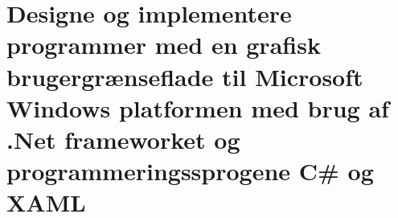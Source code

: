 \section{Designe og implementere programmer med en grafisk brugergrænseflade til Microsoft Windows platformen med brug af .Net frameworket og programmeringssprogene C\# og XAML}\label{sec:spm2}